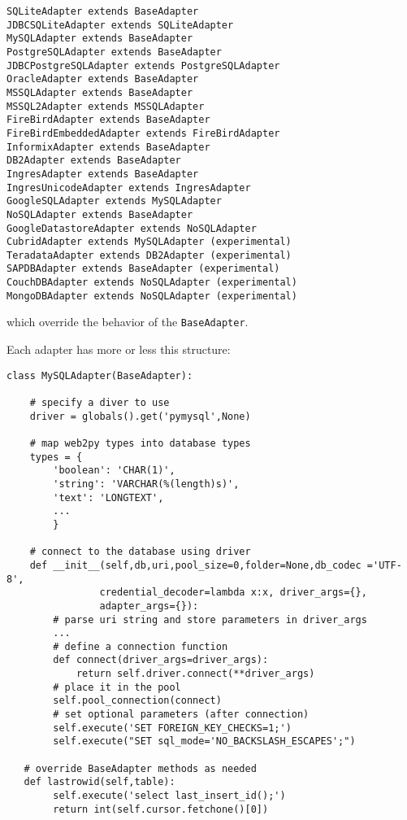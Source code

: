 \documentclass[justified,sixbynine,notoc]{tufte-book}
\def\ft{\small\tt}
\begin{document}
\begin{fullwidth}
\begin{lstlisting}
SQLiteAdapter extends BaseAdapter
JDBCSQLiteAdapter extends SQLiteAdapter
MySQLAdapter extends BaseAdapter
PostgreSQLAdapter extends BaseAdapter
JDBCPostgreSQLAdapter extends PostgreSQLAdapter
OracleAdapter extends BaseAdapter
MSSQLAdapter extends BaseAdapter
MSSQL2Adapter extends MSSQLAdapter
FireBirdAdapter extends BaseAdapter
FireBirdEmbeddedAdapter extends FireBirdAdapter
InformixAdapter extends BaseAdapter
DB2Adapter extends BaseAdapter
IngresAdapter extends BaseAdapter
IngresUnicodeAdapter extends IngresAdapter
GoogleSQLAdapter extends MySQLAdapter
NoSQLAdapter extends BaseAdapter
GoogleDatastoreAdapter extends NoSQLAdapter
CubridAdapter extends MySQLAdapter (experimental)
TeradataAdapter extends DB2Adapter (experimental)
SAPDBAdapter extends BaseAdapter (experimental)
CouchDBAdapter extends NoSQLAdapter (experimental)
MongoDBAdapter extends NoSQLAdapter (experimental)
\end{lstlisting}
\noindent which override the behavior of the {\ft BaseAdapter}.

Each adapter has more or less this structure:

\begin{lstlisting}
class MySQLAdapter(BaseAdapter):

    # specify a diver to use
    driver = globals().get('pymysql',None)

    # map web2py types into database types
    types = {
        'boolean': 'CHAR(1)',
        'string': 'VARCHAR(%(length)s)',
        'text': 'LONGTEXT',
        ...
        }

    # connect to the database using driver
    def __init__(self,db,uri,pool_size=0,folder=None,db_codec ='UTF-8',
                credential_decoder=lambda x:x, driver_args={},
                adapter_args={}):
        # parse uri string and store parameters in driver_args
        ...
        # define a connection function
        def connect(driver_args=driver_args):
            return self.driver.connect(**driver_args)
        # place it in the pool
        self.pool_connection(connect)
        # set optional parameters (after connection)
        self.execute('SET FOREIGN_KEY_CHECKS=1;')
        self.execute("SET sql_mode='NO_BACKSLASH_ESCAPES';")

   # override BaseAdapter methods as needed
   def lastrowid(self,table):
        self.execute('select last_insert_id();')
        return int(self.cursor.fetchone()[0])

\end{lstlisting}


\end{fullwidth}
\end{document}
